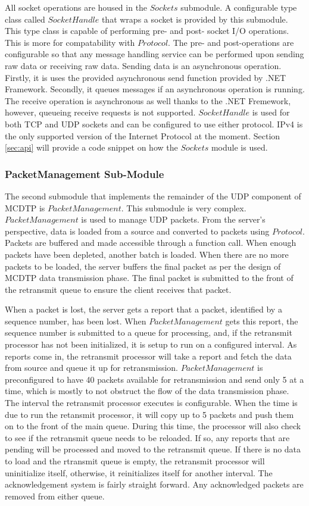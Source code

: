 All socket operations are housed in the $Sockets$ submodule. A configurable type class called $SocketHandle$ that wraps a socket is provided by this submodule. This type class is capable of performing pre- and post- socket I/O operations. This is more for compatability with $Protocol$. The pre- and post-operations are configurable so that any message handling service can be performed upon sending raw data or receiving raw data. Sending data is an asynchronous operation. Firstly, it is uses the provided asynchronous send function provided by .NET Framework. Secondly, it queues messages if an asynchronous operation is running. The receive operation is asynchronous as well thanks to the .NET Fremework, however, queueing receive requests is not supported. $SocketHandle$ is used for both TCP and UDP sockets and can be configured to use either protocol. IPv4 is the only supported version of the Internet Protocol at the moment. Section \ref{sec:api} will provide a code snippet on how the $Sockets$ module is used.

\subsubsection{PacketManagement Sub-Module}\label{sec:pm-sm}

The second submodule that implements the remainder of the UDP component of MCDTP is $PacketManagement$. This submodule is very complex. $PacketManagement$ is used to manage UDP packets. From the server's perspective, data is loaded from a source and converted to packets using $Protocol$. Packets are buffered and made accessible through a function call. When enough packets have been depleted, another batch is loaded. When there are no more packets to be loaded, the server buffers the final packet as per the design of MCDTP data transmission phase. The final packet is submitted to the front of the retransmit queue to ensure the client receives that packet.

When a packet is lost, the server gets a report that a packet, identified by a sequence number, has been lost. When $PacketManagement$ gets this report, the sequence number is submitted to a queue for processing, and, if the retransmit processor has not been initialized, it is setup to run on a configured interval. As reports come in, the retransmit processor will take a report and fetch the data from source and queue it up for retransmission. $PacketManagement$ is preconfigured to have 40 packets available for retransmission and send only 5 at a time, which is mostly to not obstruct the flow of the data transmission phase. The interval the retransmit processor executes is configurable. When the time is due to run the retansmit processor, it will copy up to 5 packets and push them on to the front of the main queue. During this time, the processor will also check to see if the retransmit queue needs to be reloaded. If so, any reports that are pending will be processed and moved to the retransmit queue. If there is no data to load and the rtransmit queue is empty, the retransmit processor will uninitialize itself, otherwise, it reinitializes itself for another interval. The acknowledgement system is fairly straight forward. Any acknowledged packets are removed from either queue.

